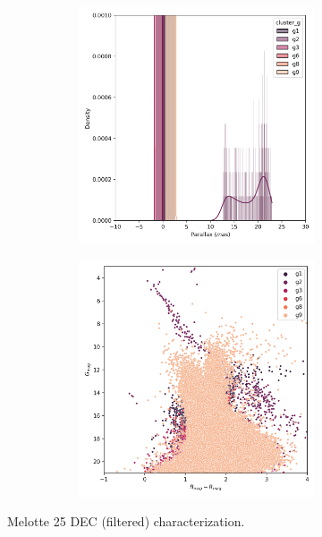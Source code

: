 \documentclass[11pt, a4paper, english]{book}
\begin{document}
\begin{figure}[H]
\begin{subfigure}{0.9\textwidth}
\begin{subfigure}[t]{0.30\textwidth}
    \end{subfigure}
    \hfill
    \begin{subfigure}[t]{0.30\textwidth}
      \centering
      \includegraphics[width=\textwidth]{../figures/melotte_25/dec_parallax_filtered_melotte_25.png}
    \end{subfigure}
    \hfill
    \begin{subfigure}[t]{0.30\textwidth}
      \centering
      \includegraphics[width=\textwidth]{../figures/melotte_25/dec_hr_diagram_filtered_melotte_25.png}
    \end{subfigure}
  \end{subfigure}
  \caption{Melotte 25 DEC (filtered) characterization.}
\end{figure}
\end{document}
